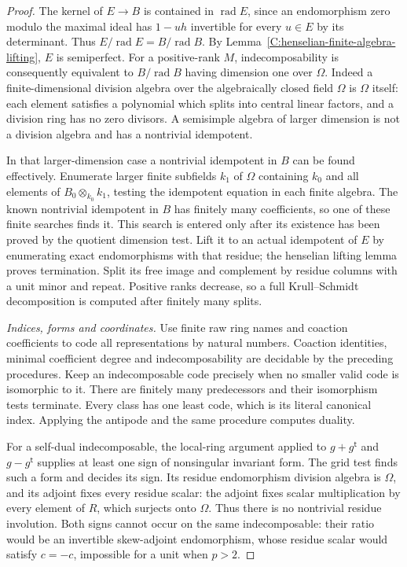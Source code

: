 \begin{proof}
The kernel of $E\to B$ is contained in
$\operatorname{rad}E$, since an endomorphism
zero modulo the maximal ideal has $1-uh$
invertible for every $u\in E$ by its determinant.
Thus
$E/\operatorname{rad}E=B/\operatorname{rad}B$.
By Lemma~\ref{C:henselian-finite-algebra-lifting},
$E$ is semiperfect.  For a positive-rank $M$,
indecomposability is consequently equivalent
to $B/\operatorname{rad}B$ having dimension one
over $\Omega$.
Indeed a finite-dimensional division algebra
over the algebraically closed field $\Omega$
is $\Omega$ itself: each element satisfies a
polynomial which splits into central linear
factors, and a division ring has no zero divisors.
A semisimple algebra of larger dimension is
not a division algebra and has a nontrivial
idempotent.

In that larger-dimension case a nontrivial
idempotent in $B$ can be found effectively.
Enumerate larger finite subfields $k_1$ of
$\Omega$ containing $k_0$ and all elements of
$B_0\otimes_{k_0}k_1$, testing the idempotent
equation in each finite algebra.
The known nontrivial idempotent in $B$ has
finitely many coefficients, so one of these
finite searches finds it.  This search is
entered only after its existence has been
proved by the quotient dimension test.
Lift it to an actual idempotent of $E$ by
enumerating exact endomorphisms with that
residue; the henselian lifting lemma proves
termination.  Split its free image and
complement by residue columns with a unit
minor and repeat.  Positive ranks decrease,
so a full Krull--Schmidt decomposition is
computed after finitely many splits.

\emph{Indices, forms and coordinates.}
Use finite raw ring names and coaction coefficients
to code all representations by natural numbers.
Coaction identities, minimal coefficient degree
and indecomposability are decidable by the
preceding procedures.
Keep an indecomposable code precisely when no
smaller valid code is isomorphic to it.
There are finitely many predecessors and their
isomorphism tests terminate.  Every class has
one least code, which is its literal canonical
index.  Applying the antipode and the same
procedure computes duality.

For a self-dual indecomposable, the local-ring
argument applied to $g+g^{\mathsf t}$ and
$g-g^{\mathsf t}$ supplies at least one sign
of nonsingular invariant form.  The grid test
finds such a form and decides its sign.
Its residue endomorphism division algebra is
$\Omega$, and its adjoint fixes every residue
scalar: the adjoint fixes scalar multiplication
by every element of $R$, which surjects onto
$\Omega$.  Thus there is no nontrivial residue
involution.  Both signs cannot occur on the
same indecomposable: their ratio would be an
invertible skew-adjoint endomorphism, whose
residue scalar would satisfy $c=-c$, impossible
for a unit when $p>2$.


\end{proof}
